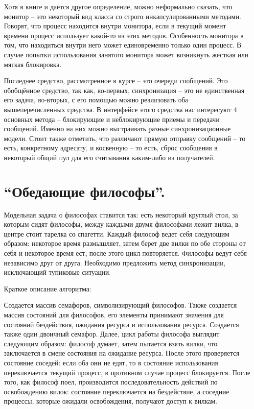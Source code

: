\documentclass[a4paper,12pt,titlepage,finall]{article}
\begin{document}
Хотя в книге и дается другое определение, можно неформально сказать, что монитор -- это некоторый вид класса со строго инкапсулированными методами. Говорят, что процесс находится внутри монитора, если в текущий момент времени процесс использует какой-то из этих методов. Особенность монитора в том, что находиться внутри него может единовременно только один процесс. В случае попытки использования занятого монитора может возникнуть жесткая или мягкая блокировка.

Последнее средство, рассмотренное в курсе -- это очереди сообщений. Это обобщённое средство, так как, во-первых, синхронизация -- это не единственная его задача, во-вторых, с его помощью можно реализовать оба вышеперечисленных средства. В интерфейсе этого средства нас интересуют 4 основных метода -- блокирующие и неблокирующие приемы и передачи сообщений. Именно на них можно выстраивать разные синхронизационные модели. Стоит также отметить, что различают прямую отправку сообщений -- то есть, конкретному адресату, и косвенную -- то есть, сброс сообщения в некоторый общий пул для его считывания каким-либо из получателей.

\section{“Обедающие
философы”.}
Модельная задача о философах ставится так: есть некоторый круглый стол, за которым сидят философы, между каждыми двумя философами лежит вилка, в центре стоит тарелка со спагетти. Каждый философ ведет себя следующим образом: некоторое время размышляет, затем берет две вилки по обе стороны от себя и некоторое время ест, после этого цикл повторяется. Философы ведут себя независимо друг от друга. Необходимо предложить метод синхронизации, исключающий тупиковые ситуации.

Краткое описание алгоритма:

Создается массив семафоров, символизирующий философов. Также создается массив состояний для философов, его элементы принимают значения для состояний бездействия, ожидания ресурса и использования ресурса. Создается также один двоичный семафор. Далее, цикл работы философа выглядит следующим образом: философ думает, затем пытается взять вилки, что заключается в смене состояния на ожидание ресурса. После этого проверяется состояние соседей: если оба они не едят, то в состояние использования переключается текущий процесс, в противном случае процесс блокируется. После того, как философ поел, производится последовательность действий по освобождению вилок: состояние переключается на бездействие, а соседние процессы, которые ожидали освобождения, получают доступ к вилкам.
\end{document}
